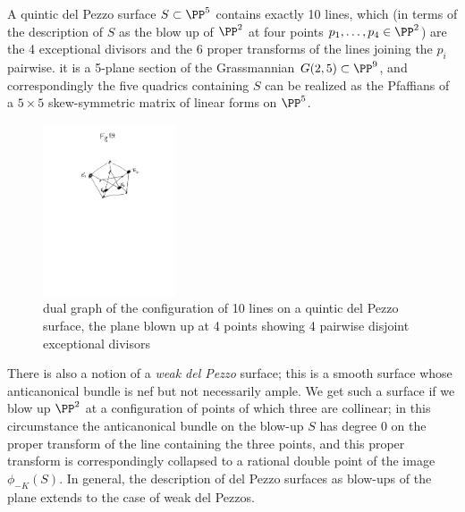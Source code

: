 %
%
%


A quintic del Pezzo surface $S \subset \PP^5$ contains exactly 10 lines, which (in terms of the description of $S$ as the blow up of $\PP^2$ at four points $p_1,\dots,p_4 \in \PP^2$) are the 4 exceptional divisors and the 6 proper transforms of the lines joining the $p_i$ pairwise. 
 it is a 5-plane section of the Grassmannian $G(2,5) \subset \PP^9$, and correspondingly the five quadrics containing $S$ can be realized as the Pfaffians of a  $5\times 5$ skew-symmetric matrix of linear forms on $\PP^5$. 

\begin{figure}
\begin{center}
\centerline {\includegraphics[height=2in]{"Fig11.4.pdf"}}
\caption{dual graph of the configuration of 10 lines on a quintic del Pezzo surface, the plane blown up
at 4 points showing 4 pairwise disjoint exceptional divisors}
\label{dual graph of the configuration of 10 lines on a quintic del Pezzo surface}
\end{center}
\end{figure}

There is also a notion of a \emph{weak del Pezzo} surface; this is a smooth surface whose anticanonical bundle is nef but not necessarily ample. We get such a surface if we blow up $\PP^2$ at a configuration of points of which three are collinear; in this circumstance the anticanonical bundle on the blow-up $S$ has degree 0 on the proper transform of the line containing the three points, and this proper transform is correspondingly collapsed to a rational double point of the image $\phi_{-K}(S)$. In general, the description of del Pezzo surfaces as blow-ups of the plane extends to the case of weak del Pezzos.



